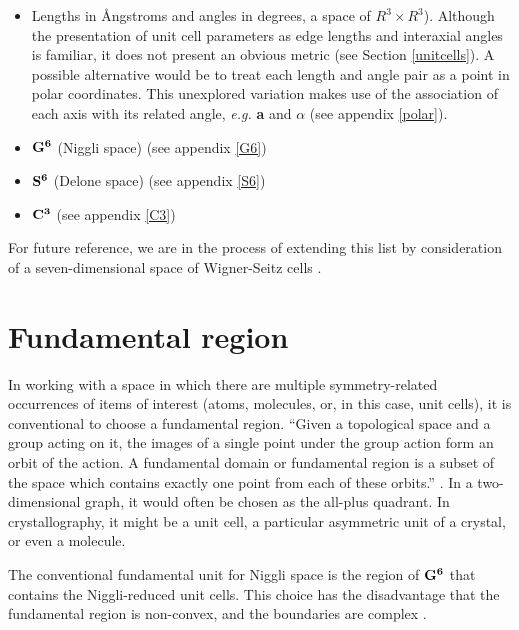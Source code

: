 \documentclass[preprint]{iucr}              %
\numberwithin{equation}{section}
\newcommand{\SVI}[0]{$\bf{S^{6}}$}
\newcommand{\GVI}[0]{$\bf{G^{6}}$}
\newcommand{\CIII}[0]{$\bf{C^{3}}$}
\begin{document}
\begin{itemize}
	\item 	Lengths in \r{A}ngstroms and angles in degrees, a 
	space of $R^3 \times R^3$).
Although the presentation of unit cell parameters as edge lengths and
interaxial angles is familiar, it does not present an obvious metric (see Section \ref{unitcells}). A
possible alternative would be to treat each length and angle pair as
a point in polar coordinates. This unexplored variation makes use
of the association of each axis with its related angle,\textit{ e.g.} \textbf{a}
and $\alpha$ (see appendix \ref{polar}).
	\item 	\GVI{} (Niggli space)
	(see appendix \ref{G6})
	\item 	\SVI{} (Delone space)
	(see appendix \ref{S6})
	\item 	\CIII{} 
	(see appendix \ref{C3})
\end{itemize}	

For future reference, we are in the process of extending 
this list by consideration of a seven-dimensional space of Wigner-Seitz cells \cite{Bernstein2023}.
	


	
	\section{Fundamental region}
	\label{fundamentaltext}
	
	In working with a space in which there are 
	multiple symmetry-related occurrences of items of interest (atoms, molecules, or,
	in this case, unit cells), it is conventional to choose a fundamental
	region. ``Given a topological space and a group acting on it, the images of a single point under the group action form an orbit of the action. A fundamental domain or fundamental region is a subset of the space which contains exactly one point from each of these orbits.'' \cite{enwiki:1028832752}. In a two-dimensional graph, it would often be chosen as the all-plus
	quadrant. In crystallography, it might be a unit cell, a
	particular asymmetric unit of a crystal, or even a molecule.
	
	The conventional fundamental unit for Niggli space is the region
	of \GVI{} that contains the Niggli-reduced unit cells. This choice
	has the disadvantage that the fundamental region is non-convex,
	and the boundaries are complex \cite{Andrews2014}.
	
\end{document}
